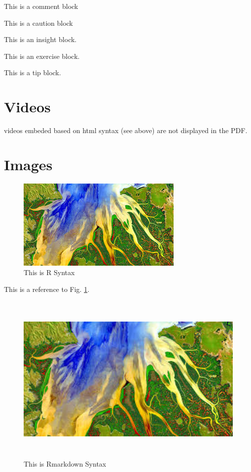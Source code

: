 \documentclass[]{book}
\theoremstyle{definition}
\theoremstyle{definition}
\theoremstyle{definition}
\theoremstyle{remark}
\let\BeginKnitrBlock\begin \let\EndKnitrBlock\end
\begin{document}
\BeginKnitrBlock{rmdcomment}
This is a comment block
\EndKnitrBlock{rmdcomment}

\BeginKnitrBlock{rmdcaution}
This is a caution block
\EndKnitrBlock{rmdcaution}

\BeginKnitrBlock{rmdinsight}
This is an insight block.
\EndKnitrBlock{rmdinsight}

\BeginKnitrBlock{rmdexercise}
This is an exercise block.
\EndKnitrBlock{rmdexercise}

\BeginKnitrBlock{rmdtip}
This is a tip block.
\EndKnitrBlock{rmdtip}

\section{Videos}\label{videos}

\BeginKnitrBlock{rmdcaution}
videos embeded based on html syntax (see above) are not displayed in the
PDF.
\EndKnitrBlock{rmdcaution}

\section{Images}\label{images}

\begin{figure}

{\centering \includegraphics[width=0.8\linewidth]{images/example-images2} 

}

\caption{This is R Syntax}\label{fig:fig13}
\end{figure}

This is a reference to Fig. \ref{fig:fig13}.

\begin{figure}
\centering
\includegraphics[width=4.79167in,height=3.28125in]{images/example-images2.jpg}
\caption{This is Rmarkdown Syntax}
\end{figure}
\end{document}
